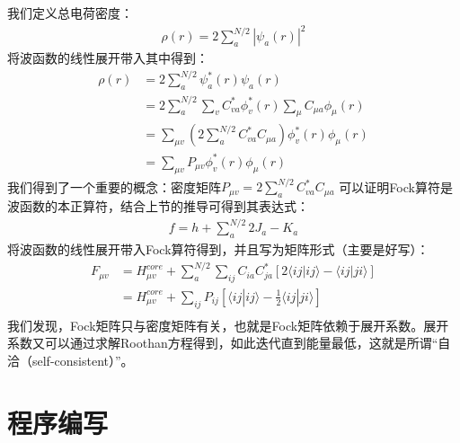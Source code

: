\documentclass[12pt, a4paper, oneside]{ctexart}
\begin{document}
我们定义总电荷密度：
\begin{equation}
\begin{aligned}
\rho(r)=2\sum_a^{N/2}|\psi_a(r)|^2
\end{aligned}
\end{equation}
将波函数的线性展开带入其中得到：
\begin{equation}
\begin{aligned}
\rho(r)&=2\sum_a^{N/2}\psi_a^*(r)\psi_a(r)\\
&=2\sum_a^{N/2}\sum_vC_{va}^*\phi_v^*(r)\sum_{\mu}C_{\mu a}\phi_{\mu}(r)\\
&=\sum_{\mu v}\left(2\sum_a^{N/2}C_{va}^*C_{\mu a}\right)\phi_v^*(r)\phi_{\mu}(r)\\
&=\sum_{\mu v}P_{\mu v}\phi_v^*(r)\phi_{\mu}(r)
\end{aligned}
\end{equation}
我们得到了一个重要的概念：密度矩阵$P_{\mu v}=2\sum_a^{N/2}C_{va}^*C_{\mu a}$
可以证明Fock算符是波函数的本正算符，结合上节的推导可得到其表达式：
\begin{equation}
\begin{aligned}
f=h+\sum_{a}^{N/2}2J_{a}-K_{a}
\end{aligned}
\end{equation}
将波函数的线性展开带入Fock算符得到，并且写为矩阵形式（主要是好写）：
\begin{equation}
\begin{aligned}
F_{\mu v}&=H_{\mu v}^{core}+\sum_a^{N/2}\sum_{ij}C_{ia}C_{ja}^*[2\langle ij|ij\rangle-\langle ij|ji\rangle]\\
&=H_{\mu v}^{core}+\sum_{ij}P_{ij}[\langle ij|ij\rangle-\frac12\langle ij|ji\rangle]\\
\end{aligned}
\end{equation}
我们发现，Fock矩阵只与密度矩阵有关，也就是Fock矩阵依赖于展开系数。展开系数又可以通过求解Roothan方程得到，如此迭代直到能量最低，这就是所谓“自洽（self-consistent）”。

\newpage

\section{程序编写}
\end{document}
